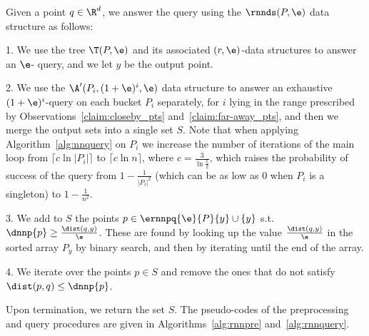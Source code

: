 \noindent Given a point $q\in \R^d$, we answer the \rnn
query using the $\rnnds(P,\e)$ data structure as follows:
\begin{slist}
\item[1.] We use the tree $\T(P,\e)$ and its
  associated $(r,\e)$-\pleb data structures to answer an $\e$-\nn
  query, and we let $y$ be the output point.
\item[2.] We use the $\A'(P_i, (1+\e)^i, \e)$ data structure to
  answer an exhaustive $(1+\e)^i$-\pleb query on each bucket $P_i$
  separately, for $i$ lying in the range prescribed by
  Observations~\ref{claim:closeby_pts} and~\ref{claim:far-away_pts},
and then we merge the output sets into a single set $S$.
Note that when applying Algorithm~\ref{alg:nnquery} on $P_i$ we
 increase the number of iterations of the main loop from
 $\lceil c \ln |P_i|\rceil$ to $\lceil c \ln n\rceil$, where
 $c=\frac{3}{\ln\frac{5}{2}}$, which raises the probability of success
 of the query from $1-\frac{1}{|P_i|^2}$ (which can be as low as
 $0$ when $P_i$  is a singleton) to $1-\frac{1}{n^2}$.
\item[3.] We add to $S$ the points $p\in \ernnpq{\e}{P}{y}\cup\{y\}$ s.t.
  $\dnnp{p}\geq \frac{\dist(q,y)}{\e}$. These are found by looking up
  the value $ \frac{\dist(q,y)}{\e}$ in the sorted array $P_y$ by
  binary search, and then by iterating until the end of the array.
\item[4.] We iterate over the points $p\in S$ and remove the ones
  that do not satisfy $\dist(p,q)\leq \dnnp{p}$.
\end{slist}
\smallskip
Upon termination, we return the set $S$.  The pseudo-codes of the
preprocessing and query procedures are given in Algorithms~\ref{alg:rnnpre}
and~\ref{alg:rnnquery}.

